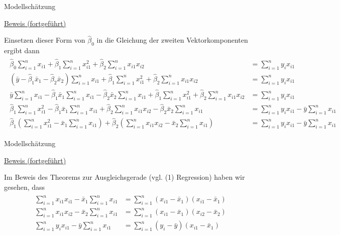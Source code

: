 \documentclass[
  8pt,
  ignorenonframetext,
]{beamer}
\begin{document}
\begin{frame}{Modellschätzung}
\protect\hypertarget{modellschuxe4tzung-6}{}
\footnotesize

\underline{Beweis (fortgeführt)}

Einsetzen dieser Form von \(\hat{\beta}_0\) in die Gleichung der zweiten
Vektorkomponenten ergibt dann \tiny \begin{align*}
\begin{split}
   \hat{\beta}_0 \sum_{i=1}^n x_{i1}
+ \hat{\beta}_1 \sum_{i=1}^n x_{i1}^2
+ \hat{\beta}_2 \sum_{i=1}^n x_{i1}x_{i2}
&
= \sum_{i=1}^n y_ix_{i1}
\\
  (\bar{y} - \hat{\beta}_1\bar{x}_1 - \hat{\beta}_2\bar{x}_2) \sum_{i=1}^n x_{i1}
+ \hat{\beta}_1 \sum_{i=1}^n x_{i1}^2
+ \hat{\beta}_2 \sum_{i=1}^n x_{i1}x_{i2}
&
= \sum_{i=1}^n y_ix_{i1}
\\
  \bar{y}\sum_{i=1}^n x_{i1}
- \hat{\beta}_1\bar{x}_1\sum_{i=1}^n x_{i1}
- \hat{\beta}_2\bar{x}_2\sum_{i=1}^n x_{i1}
+ \hat{\beta}_1 \sum_{i=1}^n x_{i1}^2
+ \hat{\beta}_2 \sum_{i=1}^n x_{i1}x_{i2}
&
= \sum_{i=1}^n y_ix_{i1}
\\
  \hat{\beta}_1 \sum_{i=1}^n x_{i1}^2
- \hat{\beta}_1\bar{x}_1\sum_{i=1}^n x_{i1}
+ \hat{\beta}_2 \sum_{i=1}^n x_{i1}x_{i2}
- \hat{\beta}_2\bar{x}_2\sum_{i=1}^n x_{i1}
&
=
  \sum_{i=1}^n y_ix_{i1}
- \bar{y}\sum_{i=1}^n x_{i1}
\\
  \hat{\beta}_1 \left(\sum_{i=1}^n x_{i1}^2     - \bar{x}_1\sum_{i=1}^n x_{i1}\right)
+ \hat{\beta}_2 \left(\sum_{i=1}^n x_{i1}x_{i2} - \bar{x}_2\sum_{i=1}^n x_{i1} \right)
&
=
  \sum_{i=1}^n y_ix_{i1}
- \bar{y}\sum_{i=1}^n x_{i1}
\end{split}
\end{align*}
\end{frame}

\begin{frame}{Modellschätzung}
\protect\hypertarget{modellschuxe4tzung-7}{}
\footnotesize

\underline{Beweis (fortgeführt)}

Im Beweis des Theorems zur Ausgleichsgerade (vgl. (1) Regression) haben
wir gesehen, dass \begin{align}
\begin{split}
\sum_{i=1}^n x_{i1}x_{i1} - \bar{x}_1\sum_{i=1}^n x_{i1} & = \sum_{i=1}^n (x_{i1} - \bar{x}_1)(x_{i1} - \bar{x}_1) \\
\sum_{i=1}^n x_{i1}x_{i2} - \bar{x}_2\sum_{i=1}^n x_{i1} & = \sum_{i=1}^n (x_{i1} - \bar{x}_1)(x_{i2} - \bar{x}_2) \\
\sum_{i=1}^n y_ix_{i1}    - \bar{y}  \sum_{i=1}^n x_{i1} & = \sum_{i=1}^n (y_i    - \bar{y}  )(x_{i1} - \bar{x}_1)
\end{split}
\end{align} \footnotesize
\end{frame}
\end{document}
